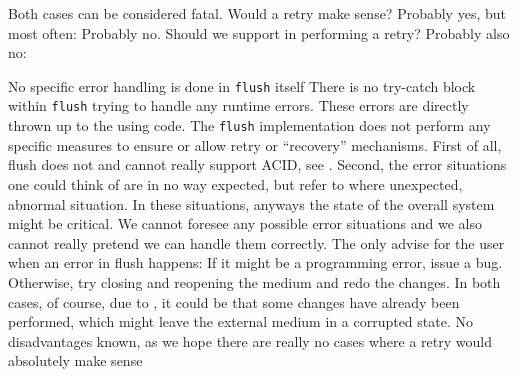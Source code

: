 Both cases can be considered fatal. Would a retry make sense? Probably yes, but most often: Probably no. Should we support in performing a retry? Probably also no:

{%
No specific error handling is done in \texttt{flush} itself
}
{%
There is no try-catch block within \texttt{flush} trying to handle any runtime errors. These errors are directly thrown up to the using code. The \texttt{flush} implementation does not perform any specific measures to ensure or allow retry or ``recovery'' mechanisms.
}
{%
First of all, flush does not and cannot really support ACID, see . Second, the error situations one could think of are in no way expected, but refer to where unexpected, abnormal situation. In these situations, anyways the state of the overall system might be critical. We cannot foresee any possible error situations and we also cannot really pretend we can handle them correctly. The only advise for the user when an error in flush happens: If it might be a programming error, issue a bug. Otherwise, try closing and reopening the medium and redo the changes. In both cases, of course, due to , it could be that some changes have already been performed, which might leave the external medium in a corrupted state.
}
{%
No disadvantages known, as we hope there are really no cases where a retry would absolutely make sense
}

